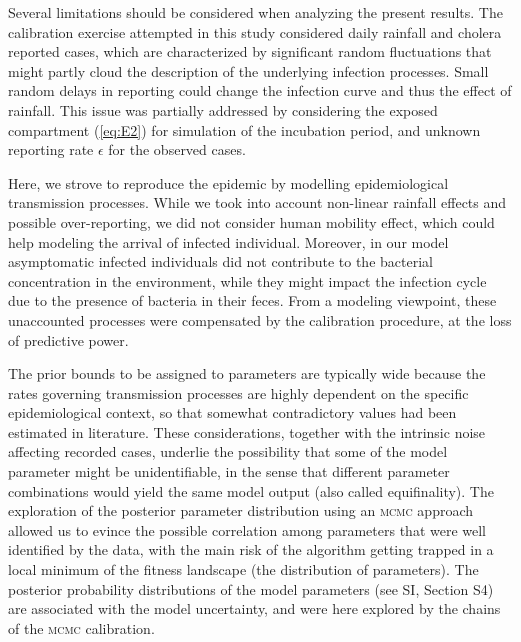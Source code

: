 Several limitations should be considered when analyzing the present results. The calibration exercise attempted in this study considered daily rainfall and cholera reported cases, which are characterized by significant random fluctuations that might partly cloud the description of the underlying infection processes. 
Small random delays in reporting could change the infection curve and thus the effect of rainfall. This issue was partially addressed by considering the exposed compartment (\ref{eq:E2}) for simulation of the incubation period, and unknown reporting rate $\epsilon$ for the observed cases.

Here, we strove to reproduce the epidemic by modelling epidemiological transmission processes. %
While we took into account non-linear rainfall effects and possible over-reporting, we did not consider human mobility effect\cite{Gatto:GeneralizedReproductionNumbers:2012,Bertuzzo:SpatiallyExplicitModels:2010,Mari:PredictiveAbilityMechanistic:2015,Perez-Saez:ClimatedrivenEndemicCholera:2017}, which could help modeling the arrival of infected individual.  Moreover, in our model asymptomatic infected individuals did not contribute to the bacterial concentration in the environment, while they might impact the infection cycle due to the presence of bacteria in their feces. From a modeling viewpoint, these unaccounted processes were compensated by the calibration procedure, at the loss of predictive power.

The prior bounds to be assigned to parameters are typically wide\cite{Akman:ExaminationModelsCholera:2016} because the rates governing transmission processes are highly dependent on the specific epidemiological context, so that somewhat contradictory values had been estimated in literature. These considerations, together with the intrinsic noise affecting recorded cases, underlie the possibility that some of the model parameter might be unidentifiable\cite{Eisenberg:IdentifiabilityEstimationMultiple:2013}, in the sense that different parameter combinations would yield the same model output (also called equifinality). 
The exploration of the posterior parameter distribution using an \textsc{mcmc} approach allowed us to evince the possible correlation among parameters that were well identified by the data, with the main risk of the algorithm getting trapped in a local minimum of the fitness landscape (the distribution of parameters). The posterior probability distributions of the model parameters (see SI, Section S4) are associated with the model uncertainty, and were here explored by the chains of the \textsc{mcmc} calibration.


